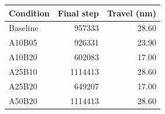 \begin{center}\small
\begin{tabular}{lrr}\toprule
Condition & Final step & Travel (nm)\\\midrule
Baseline & 957333 & 28.60 \\
A10B05 & 926331 & 23.90 \\
A10B20 & 602083 & 17.00 \\
A25B10 & 1114413 & 28.60 \\
A25B20 & 649207 & 17.00 \\
A50B20 & 1114413 & 28.60 \\
\bottomrule\end{tabular}
\end{center}

